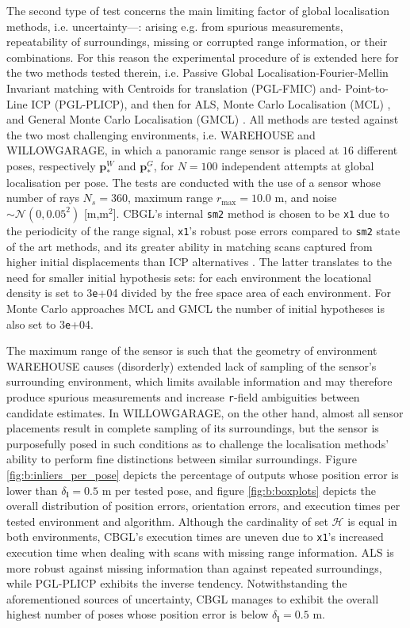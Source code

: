 The second type of test concerns the main limiting factor of global
localisation methods, i.e. uncertainty---: arising e.g. from spurious
measurements, repeatability of surroundings, missing or corrupted range
information, or their combinations. For this reason the experimental procedure
of \cite{Filotheou2022g} is extended here for the two methods tested therein,
i.e. Passive Global Localisation-Fourier-Mellin Invariant matching with
Centroids for translation (PGL-FMIC) and- Point-to-Line ICP (PGL-PLICP), and
then for ALS, Monte Carlo Localisation (MCL) \cite{mcl}, and
General Monte Carlo Localisation (GMCL) \cite{gmcl}. All methods are tested
against the two most challenging environments, i.e.  WAREHOUSE and
WILLOWGARAGE, in which a panoramic range sensor is placed at $16$ different
poses, respectively $\bm{p}_{\ast}^{W}$ and $\bm{p}_{\ast}^{G}$, for $N = 100$
independent attempts at global localisation per pose. The tests are conducted
with the use of a sensor whose number of rays $N_s = 360$, maximum range
$r_{\max} = 10.0$ m, and noise $\sim \mathcal{N}(0, 0.05^2)$ [m,m$^2$].  CBGL's
internal \texttt{sm2} method is chosen to be \texttt{x1} due to the periodicity
of the range signal, \texttt{x1}'s robust pose errors compared to \texttt{sm2}
state of the art methods, and its greater ability in matching scans captured
from higher initial displacements than ICP alternatives \cite{Filotheou2023a}.
The latter translates to the need for smaller initial hypothesis sets: for each
environment the locational density is set to $3$\texttt{e}+04 divided by the
free space area of each environment. For Monte Carlo approaches MCL and GMCL
the number of initial hypotheses is also set to $3$\texttt{e}+04.

The maximum range of the sensor is such that the geometry of environment
WAREHOUSE causes (disorderly) extended lack of sampling of the sensor's
surrounding environment, which limits available information and may therefore
produce spurious measurements and increase \texttt{r}-field ambiguities between
candidate estimates. In WILLOWGARAGE, on the other hand, almost all sensor
placements result in complete sampling of its surroundings, but the sensor is
purposefully posed in such conditions as to challenge the localisation methods'
ability to perform fine distinctions between similar surroundings. Figure
\ref{fig:b:inliers_per_pose} depicts the percentage of outputs whose position
error is lower than $\delta_{\bm{l}} = 0.5$ m per tested pose, and figure
\ref{fig:b:boxplots} depicts the overall distribution of position errors,
orientation errors, and execution times per tested environment and algorithm.
Although the cardinality of set $\mathcal{H}$ is equal in both environments,
CBGL's execution times are uneven due to \texttt{x1}'s increased execution time
when dealing with scans with missing range information. ALS is more robust
against missing information than against repeated surroundings, while PGL-PLICP
exhibits the inverse tendency. Notwithstanding the aforementioned sources of
uncertainty, CBGL manages to exhibit the overall highest number of poses whose
position error is below $\delta_{\bm{l}} = 0.5$ m.

